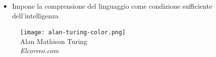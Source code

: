 \begin{frame}[t,fragile]
{\begin{minipage}[t]{\textwidth}
\begin{minipage}[t]{0.6\textwidth}
\begin{itemize}[leftmargin=10pt,align=right]
				    \onslide<4->\item[\alert{\faHandORight}] Impone la comprensione del linguaggio come \alert{condizione sufficiente} dell'intelligenza
			    \end{itemize}
		    \end{minipage}
		    \begin{minipage}[t]{0.4\textwidth}
			    \centering
			    \begin{figure}[ht]
				    \texttt{[image: alan-turing-color.png]}
				    {\tiny\\Alan Mathison Turing\\\vspace*{-1pt}\textit{\textcopyright Elcorreo.com}}
			    \end{figure}
		    \end{minipage}
	    \end{minipage}
    }
\end{frame}
%
